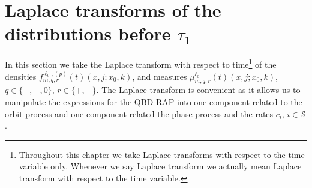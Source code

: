 \section{Laplace transforms of the distributions before \(\tau_1\)}\label{sec: lst on no change}
In this section we take the Laplace transform with respect to time\footnote{Throughout this chapter we take Laplace transforms with respect to the time variable only. Whenever we say Laplace transform we actually mean Laplace transform with respect to the time variable.} of the densities \(f_{m,q,r}^{\ell_0,(p)}(t)(x,j;x_0,k)\), and measures \(\mu_{m,q,r}^{\ell_0}(t)(x,j;x_0,k)\), \(q\in\{+,-,0\}\), \(r\in\{+,-\}\). The Laplace transform is convenient as it allows us to manipulate the expressions for the QBD-RAP into one component related to the orbit process and one component related the phase process and the rates \(c_i,\,i\in\mathcal S\). 

